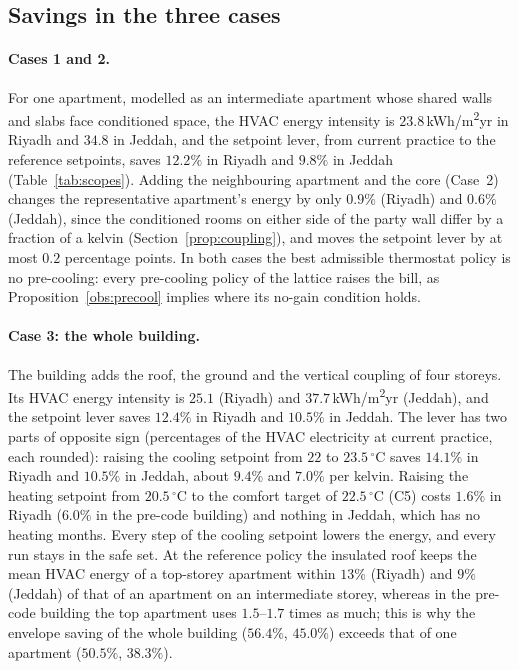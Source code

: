 \documentclass[10pt,a4paper,twocolumn]{article}
\theoremstyle{definition}
\begin{document}
\subsection{Savings in the three cases}\label{sec:scalability}
\paragraph{Cases 1 and 2.}\label{sec:stepa}\label{sec:stepb} For one apartment, modelled as an intermediate apartment whose shared walls and slabs face conditioned space, the HVAC energy intensity is $23.8\,$kWh/m\textsuperscript{2}yr in Riyadh and $34.8$ in Jeddah, and the setpoint lever, from current practice to the reference setpoints, saves $12.2\%$ in Riyadh and $9.8\%$ in Jeddah (Table~\ref{tab:scopes}). Adding the neighbouring apartment and the core (Case~2) changes the representative apartment's energy by only $0.9\%$ (Riyadh) and $0.6\%$ (Jeddah), since the conditioned rooms on either side of the party wall differ by a fraction of a kelvin (Section~\ref{prop:coupling}), and moves the setpoint lever by at most $0.2$ percentage points. In both cases the best admissible thermostat policy is no pre-cooling: every pre-cooling policy of the lattice raises the bill, as Proposition~\ref{obs:precool} implies where its no-gain condition holds.

\paragraph{Case 3: the whole building.}\label{sec:stepc} The building adds the roof, the ground and the vertical coupling of four storeys. Its HVAC energy intensity is $25.1$ (Riyadh) and $37.7\,$kWh/m\textsuperscript{2}yr (Jeddah), and the setpoint lever saves $12.4\%$ in Riyadh and $10.5\%$ in Jeddah. The lever has two parts of opposite sign (percentages of the HVAC electricity at current practice, each rounded): raising the cooling setpoint from $22$ to $23.5\,^{\circ}$C saves $14.1\%$ in Riyadh and $10.5\%$ in Jeddah, about $9.4\%$ and $7.0\%$ per kelvin. Raising the heating setpoint from $20.5\,^{\circ}$C to the comfort target of $22.5\,^{\circ}$C (C5) costs $1.6\%$ in Riyadh ($6.0\%$ in the pre-code building) and nothing in Jeddah, which has no heating months. Every step of the cooling setpoint lowers the energy, and every run stays in the safe set. At the reference policy the insulated roof keeps the mean HVAC energy of a top-storey apartment within $13\%$ (Riyadh) and $9\%$ (Jeddah) of that of an apartment on an intermediate storey, whereas in the pre-code building the top apartment uses $1.5$--$1.7$ times as much; this is why the envelope saving of the whole building ($56.4\%$, $45.0\%$) exceeds that of one apartment ($50.5\%$, $38.3\%$).
\end{document}
